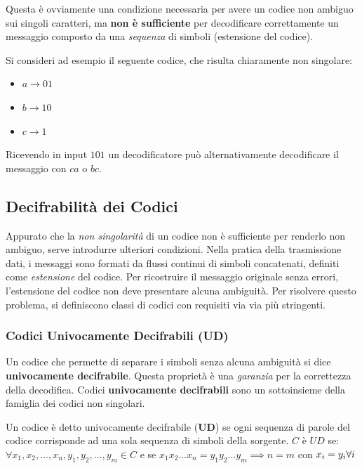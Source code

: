 Questa è ovviamente una condizione necessaria per avere un codice non ambiguo sui singoli caratteri, ma \textbf{non è sufficiente} per decodificare correttamente un messaggio composto da una \textit{sequenza} di simboli (estensione del codice).

Si consideri ad esempio il seguente codice, che risulta chiaramente non singolare:
\begin{itemize}
    \item $a \rightarrow  01$
    \item $b \rightarrow  10$
    \item $c \rightarrow  1$
\end{itemize}
Ricevendo in input $101$ un decodificatore può alternativamente decodificare il messaggio con $ca$ o $bc$.

\subsection{Decifrabilità dei Codici}
Appurato che la \textit{non singolarità} di un codice non è sufficiente per renderlo non ambiguo, serve introdurre ulteriori condizioni. Nella pratica della trasmissione dati, i messaggi sono formati da flussi continui di simboli concatenati, definiti come \textit{estensione} del codice. Per ricostruire il messaggio originale senza errori, l'estensione del codice non deve presentare alcuna ambiguità. Per risolvere questo problema, si definiscono classi di codici con requisiti via via più stringenti.

\subsubsection{Codici Univocamente Decifrabili (UD)}

Un codice che permette di separare i simboli senza alcuna ambiguità si dice \textbf{univocamente decifrabile}. Questa proprietà è una \textit{garanzia} per la correttezza della decodifica. Codici \textbf{univocamente decifrabili} sono un sottoinsieme della famiglia dei codici non singolari.

\begin{definition}
    Un codice è detto univocamente decifrabile (\textbf{UD}) se ogni sequenza di parole del codice corrisponde ad una sola sequenza di simboli della sorgente.
    $C$ è $UD$ se: $\forall x_1, x_2, \dots, x_n, y_1, y_2, \dots, y_m \in C$ e se $x_1x_2\dots x_n = y_1y_2\dots y_m \implies n = m$ con $x_i = y_i \space \forall i$
\end{definition}

